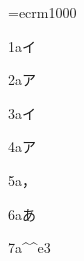 \font\x=ecrm1000 \x
\parindent0pt\noautoxspacing
{}
\def\あ{ア}
\def\，{イ}

1a\，

2a\あ


3a\，

4a\あ

5a，

6aあ

7a\^^e3^^81^^82

\bye


